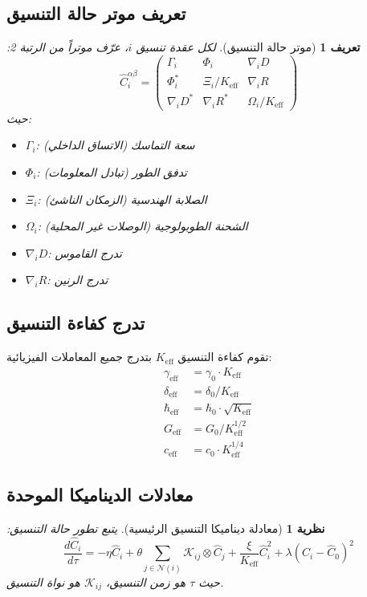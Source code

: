 \documentclass[11pt,a4paper]{article}
\newtheorem{theorem}{نظرية}
\newtheorem{definition}{تعريف}
\begin{document}
	\subsection{تعريف موتر حالة التنسيق}
	\begin{definition}[موتر حالة التنسيق]
		لكل عقدة تنسيق $i$، عرّف موتراً من الرتبة 2:
		\[
		\hat{C}_i^{\alpha\beta} = \begin{pmatrix}
			\Gamma_i & \Phi_i & \nabla_i D \\
			\Phi_i^* & \Xi_i/K_{\mathrm{eff}} & \nabla_i R \\
			\nabla_i D^* & \nabla_i R^* & \Omega_i/K_{\mathrm{eff}}
		\end{pmatrix}
		\]
		حيث:
		\begin{itemize}
			\item $\Gamma_i$: سعة التماسك (الاتساق الداخلي)
			\item $\Phi_i$: تدفق الطور (تبادل المعلومات)
			\item $\Xi_i$: الصلابة الهندسية (الزمكان الناشئ)
			\item $\Omega_i$: الشحنة الطوبولوجية (الوصلات غير المحلية)
			\item $\nabla_i D$: تدرج القاموس
			\item $\nabla_i R$: تدرج الرنين
		\end{itemize}
	\end{definition}
	
	\subsection{تدرج كفاءة التنسيق}
	تقوم كفاءة التنسيق $K_{\mathrm{eff}}$ بتدرج جميع المعاملات الفيزيائية:
	\[
	\begin{aligned}
		\gamma_{\mathrm{eff}} &= \gamma_0 \cdot K_{\mathrm{eff}} \\
		\delta_{\mathrm{eff}} &= \delta_0 / K_{\mathrm{eff}} \\
		\hbar_{\mathrm{eff}} &= \hbar_0 \cdot \sqrt{K_{\mathrm{eff}}} \\
		G_{\mathrm{eff}} &= G_0 / K_{\mathrm{eff}}^{1/2} \\
		c_{\mathrm{eff}} &= c_0 \cdot K_{\mathrm{eff}}^{1/4}
	\end{aligned}
	\]
	
	\subsection{معادلات الديناميكا الموحدة}
	\begin{theorem}[معادلة ديناميكا التنسيق الرئيسية]
		يتبع تطور حالة التنسيق:
		\[
		\frac{d\hat{C}_i}{d\tau} = -\eta \hat{C}_i + \theta \sum_{j \in \mathcal{N}(i)} \mathcal{K}_{ij} \otimes \hat{C}_j + \frac{\xi}{K_{\mathrm{eff}}} \hat{C}_i^2 + \lambda (\hat{C}_i - \hat{C}_0)^2
		\]
		حيث $\tau$ هو زمن التنسيق، $\mathcal{K}_{ij}$ هو نواة التنسيق.
	\end{theorem}
	
\end{document}
